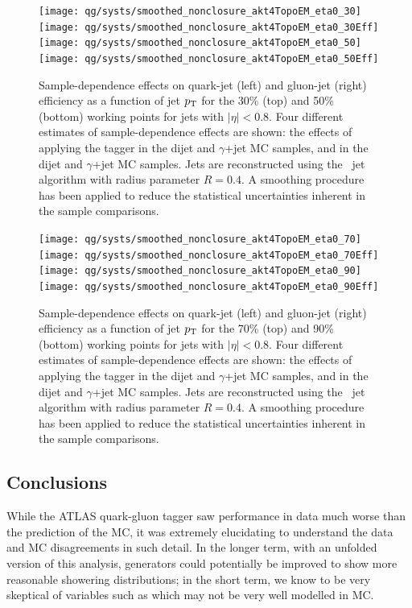 \begin{figure}[htbp]
\begin{center}
\texttt{[image: qg/systs/smoothed\_nonclosure\_akt4TopoEM\_eta0\_30]}
\texttt{[image: qg/systs/smoothed\_nonclosure\_akt4TopoEM\_eta0\_30Eff]} \\
\texttt{[image: qg/systs/smoothed\_nonclosure\_akt4TopoEM\_eta0\_50]}
\texttt{[image: qg/systs/smoothed\_nonclosure\_akt4TopoEM\_eta0\_50Eff]} \\
\caption{ Sample-dependence effects on quark-jet (left) and gluon-jet (right) efficiency as a function
of jet $p_{\text{T}}$ for the 30\% (top) and 50\% (bottom) working points for jets with $|\eta|<0.8$.  Four different estimates
of sample-dependence effects are shown: the effects of applying the tagger in the
dijet and $\gamma$+jet  MC samples, and in the dijet and $\gamma$+jet \Herwigpp MC samples.
Jets are reconstructed using the \AKT\ jet algorithm with radius parameter $R=0.4$.
A smoothing procedure has been applied to reduce the statistical uncertainties inherent in the
sample comparisons.
}
\label{fig:jet-reconstruction:qg:extractSyst}
\end{center}
\end{figure}


\begin{figure}[htbp]
\begin{center}
\texttt{[image: qg/systs/smoothed\_nonclosure\_akt4TopoEM\_eta0\_70]}
\texttt{[image: qg/systs/smoothed\_nonclosure\_akt4TopoEM\_eta0\_70Eff]} \\
\texttt{[image: qg/systs/smoothed\_nonclosure\_akt4TopoEM\_eta0\_90]}
\texttt{[image: qg/systs/smoothed\_nonclosure\_akt4TopoEM\_eta0\_90Eff]} \\
\caption{ Sample-dependence effects on quark-jet (left) and gluon-jet (right) efficiency as a function
of jet $p_{\text{T}}$ for the 70\% (top) and 90\% (bottom) working points for jets with $|\eta|<0.8$.  Four different estimates
of sample-dependence effects are shown: the effects of applying the tagger in the 
dijet and $\gamma$+jet  MC samples, and in the dijet and $\gamma$+jet \Herwigpp MC samples.  
Jets are reconstructed using the \AKT\ jet algorithm with radius parameter $R=0.4$. 
A smoothing procedure has been applied to reduce the statistical uncertainties inherent in the
sample comparisons. 
}
\label{fig:jet-reconstruction:qg:extractSyst2}
\end{center}
\end{figure}

\subsection{Conclusions}

While the ATLAS quark-gluon tagger saw performance in data much worse than the prediction of the \Pythia MC, it was extremely elucidating to understand the data and MC disagreements in such detail. In the longer term, with an unfolded version of this analysis, generators could potentially be improved to show more reasonable showering distributions; in the short term, we know to be very skeptical of variables such as \ntrk which may not be very well modelled in MC.